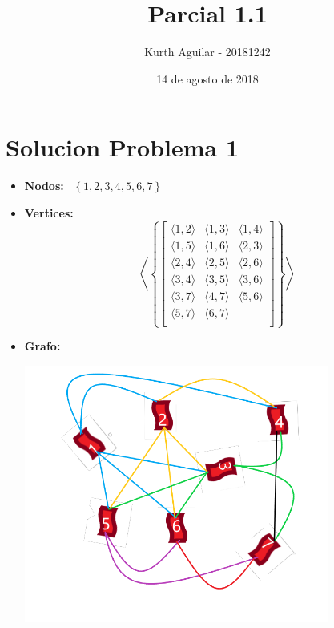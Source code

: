 \documentclass[10pt,a4paper]{article}
\begin{document}
\title{Parcial 1.1}
\author{Kurth Aguilar - 20181242 }
\date{14 de agosto de 2018}
\maketitle
\section*{Solucion Problema 1}
\begin{itemize}
\item \textbf{Nodos: } \ $ \left\lbrace 1,2,3,4,5,6,7\right\rbrace $
\item \textbf{Vertices: }  
 $$
    \left\langle \left\{
        \begin{bmatrix}
            \langle 1,2 \rangle & \langle 1,3 \rangle & \langle 1,4 \rangle \\
            \langle 1,5 \rangle & \langle 1,6 \rangle & \langle 2,3 \rangle \\
            \langle 2,4 \rangle & \langle 2,5 \rangle & \langle 2,6 \rangle \\
            \langle 3,4 \rangle & \langle 3,5 \rangle & \langle 3,6 \rangle \\
            \langle 3,7 \rangle & \langle 4,7 \rangle & \langle 5,6 \rangle \\
            \langle 5,7 \rangle & \langle 6,7 \rangle &   \\
        \end{bmatrix}
    \right\} \right\rangle
$$
\item \textbf{Grafo:}
\begin{center}
\includegraphics[width=10cm]{grafo.png}  
\end{center}
\end{itemize}
\end{document}
